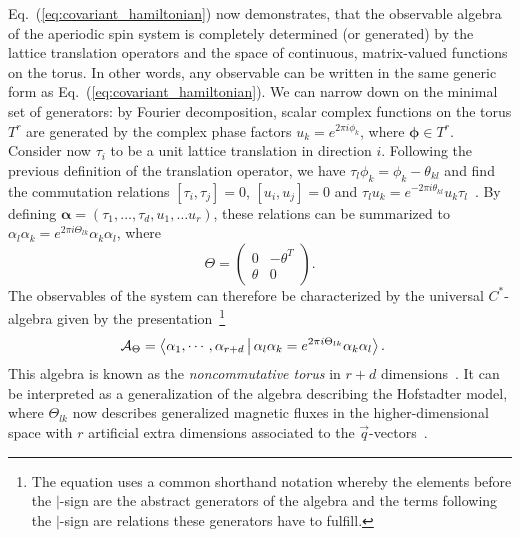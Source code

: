 \documentclass[
    10pt,
    aps,
    prl,
    twocolumn,
    floatfix,
    superscriptaddress
]{revtex4-2}
\newcommand{\SupplementalMaterial}{\cite{Note1}}
\newcommand{\revise}[1]{{\color{blue}#1}}
\begin{document}
Eq.~(\ref{eq:covariant_hamiltonian}) now demonstrates, that the observable algebra of the aperiodic spin system is completely determined \revise{(or generated)} by the lattice translation operators and the space of continuous, matrix-valued functions on the torus.
\revise{In other words, any observable can be written in the same generic form as Eq.~(\ref{eq:covariant_hamiltonian}).
We can narrow down on the minimal set of generators: 
by Fourier decomposition, scalar complex functions on the torus $T^r$ are generated by the complex phase factors $u_k = e^{ 2 \pi i \phi_k}$, where $\boldsymbol{\phi} \in T^r $.
Consider now $\tau_i$ to be a unit lattice translation in direction $i$. 
Following the previous definition of the translation operator, we have $ \tau_l \phi_k = \phi_k - \theta_{kl}$  and find}
the commutation relations $ [\tau_i, \tau_j] = 0 $, $ [u_i, u_j]  = 0$ and $\tau_l u_k = e^{-2 \pi i \theta_{kl}} u_k  \tau_l$~\SupplementalMaterial.
By defining $\boldsymbol{\alpha}=(\tau_1, \ldots, \tau_d, u_1,\ldots u_r )$, these relations can be summarized to $\alpha_l \alpha_k = e^{2 \pi i \Theta_{lk}} \alpha_k  \alpha_l$, where
\begin{equation}
    \Theta = \begin{pmatrix}
    0 & -\theta^T \\
    \theta & 0
    \end{pmatrix} .
\end{equation}
The observables of the system can therefore be characterized by the universal $C^\ast$-algebra given by the presentation~\footnote{\revise{The equation uses a common shorthand notation whereby the elements before the $|$-sign are the abstract generators of the algebra and the terms following the $|$-sign are relations these generators have to fulfill.}}
\begin{align}
    \mathcal{A}_\Theta &= \Braket{ \alpha_1, \cdots, \alpha_{r+d}
    |  \alpha_l \alpha_k = e^{ 2 \pi i \Theta_{lk}} \alpha_k  \alpha_l }.
\end{align}
This algebra is known as the \emph{noncommutative torus} in $r+d$ dimensions~\cite{Rieffel1981, Connes1994, Prodan2019}.
\revise{It can be interpreted as a generalization of the algebra describing the Hofstadter model, where $\Theta_{lk}$ now describes generalized magnetic fluxes in the higher-dimensional space with $r$ artificial extra dimensions associated to the $\vec{q}$-vectors~\cite{Kraus2013, Ma2021}}.
\end{document}
